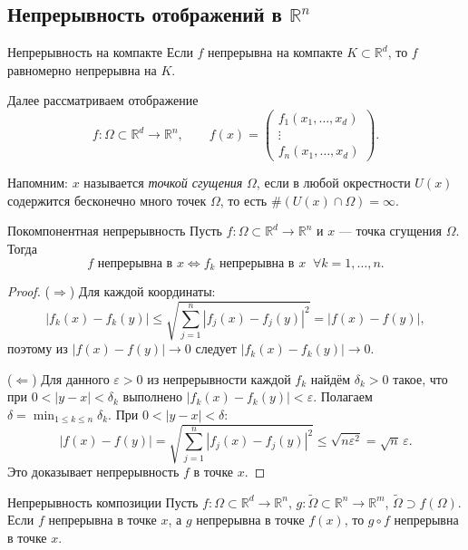 \subsection{Непрерывность отображений в $\mathbb{R}^n$}

\begin{Theorem}{Непрерывность на компакте}{}
	Если $f$ непрерывна на компакте $K\subset\mathbb{R}^d$, то $f$ равномерно непрерывна на $K$.
\end{Theorem}

Далее рассматриваем отображение
\[
f:\Omega\subset\mathbb{R}^d\to\mathbb{R}^n,\qquad
f(x)=\begin{pmatrix}f_1(x_1,\ldots,x_d)\\\vdots\\f_n(x_1,\ldots,x_d)\end{pmatrix}.
\]

Напомним: $x$ называется \emph{точкой сгущения} $\Omega$, если в любой окрестности $U(x)$ содержится бесконечно много точек $\Omega$, то есть $\#(U(x)\cap\Omega)=\infty$.

\begin{Statement}{Покомпонентная непрерывность}{}
	Пусть $f:\Omega\subset\mathbb{R}^d\to\mathbb{R}^n$ и $x$ --- точка сгущения $\Omega$. Тогда
	\[
	f\text{ непрерывна в }x
	\iff
	f_k\text{ непрерывна в }x\;\;\forall k=1,\ldots,n.
	\]
\end{Statement}

\begin{proof}
	($\Rightarrow$) Для каждой координаты:
	\[
	|f_k(x)-f_k(y)|\le\sqrt{\sum_{j=1}^n|f_j(x)-f_j(y)|^2}=|f(x)-f(y)|,
	\]
	поэтому из $|f(x)-f(y)|\to0$ следует $|f_k(x)-f_k(y)|\to0$.
	
	($\Leftarrow$) Для данного $\varepsilon>0$ из непрерывности каждой $f_k$ найдём $\delta_k>0$ такое, что при $0<|y-x|<\delta_k$ выполнено $|f_k(x)-f_k(y)|<\varepsilon$. Полагаем $\delta=\min_{1\le k\le n}\delta_k$. При $0<|y-x|<\delta$:
	\[
	|f(x)-f(y)|=\sqrt{\sum_{j=1}^n|f_j(x)-f_j(y)|^2}\le\sqrt{n\varepsilon^2}=\sqrt{n}\,\varepsilon.
	\]
	Это доказывает непрерывность $f$ в точке $x$.
\end{proof}

\begin{Theorem}{Непрерывность композиции}{}
	Пусть $f:\Omega\subset\mathbb{R}^d\to\mathbb{R}^n$, $g:\widetilde\Omega\subset\mathbb{R}^n\to\mathbb{R}^m$,
	$\widetilde\Omega\supset f(\Omega)$. Если $f$ непрерывна в точке $x$, а $g$ непрерывна в точке $f(x)$,
	то $g\circ f$ непрерывна в точке $x$.
\end{Theorem}

